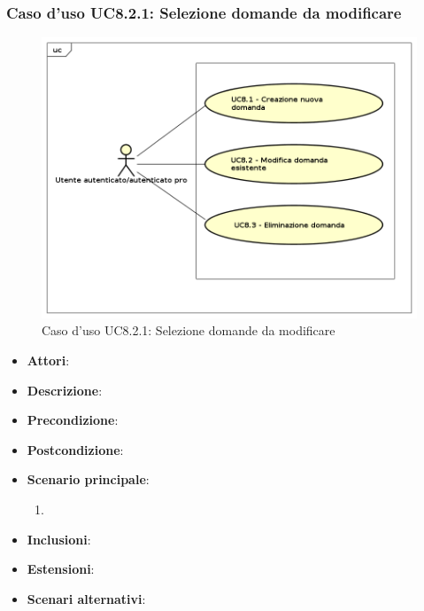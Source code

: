 		\subsubsection{Caso d'uso UC8.2.1: Selezione domande da modificare}
		\label{UC8.2.1}
		\begin{figure}[h]
			\centering
			\includegraphics[scale=0.5,keepaspectratio]{UML/UC8.png}
			\caption{Caso d'uso UC8.2.1: Selezione domande da modificare}
		\end{figure}
		\FloatBarrier
		\begin{itemize}
			\item \textbf{Attori}: 
			\item \textbf{Descrizione}:
			\item \textbf{Precondizione}: 
			\item \textbf{Postcondizione}: 
			\item \textbf{Scenario principale}: 
			\begin{enumerate}
				\item
			\end{enumerate}
			\item \textbf{Inclusioni}: 
			\item \textbf{Estensioni}: 
			\item \textbf{Scenari alternativi}: 
		\end{itemize}









